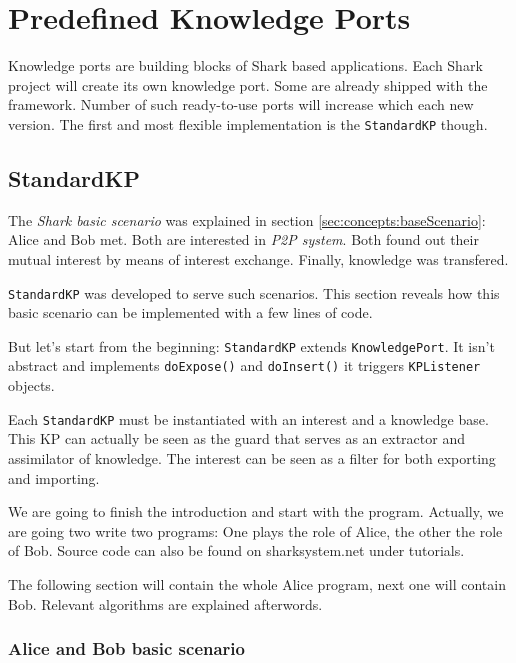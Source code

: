 \chapter{Predefined Knowledge Ports}
Knowledge ports are building blocks of Shark based applications.
Each Shark project will create its own knowledge port. Some are
already shipped with the framework. Number of such ready-to-use
ports will increase which each new version. The first and most flexible
implementation is the {\tt StandardKP} though.

\section{StandardKP}
\label{sec:knowledgePorts:StandardKP}
The  {\it Shark basic scenario} was explained in section \ref{sec:concepts:baseScenario}: Alice and Bob met. Both are interested in {\it P2P system}. Both found out their mutual interest by means of interest exchange. Finally, knowledge was transfered.

{\tt StandardKP} was developed to serve such scenarios. This section reveals how this basic scenario can be implemented with a few lines of code.

But let's start from the beginning: {\tt StandardKP} extends {\tt KnowledgePort}. It isn't abstract and implements {\tt doExpose()} and {\tt doInsert()} it triggers {\tt KPListener} objects.

Each {\tt StandardKP} must be instantiated with an interest and a knowledge base. This KP can actually be seen as the guard that serves as an extractor and
assimilator of knowledge. The interest can be seen as a filter for both exporting and importing.

We are going to finish the introduction and start with the program. Actually, we are going two write two programs: One plays the role of Alice, the other the role of Bob. Source code can also be found on sharksystem.net under tutorials.

The following section will contain the whole Alice program, next one will contain Bob. Relevant algorithms are explained afterwords.

\subsection{Alice and Bob basic scenario}
